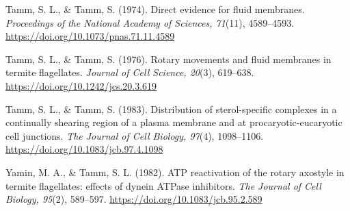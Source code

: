 \documentclass[authordate, anecdote]{jote-new-article}
\begin{document}
	



	Tamm, S. L., \& Tamm, S. (1974). Direct evidence for fluid membranes. \emph{Proceedings of} \emph{the National Academy of Sciences, 71}(11), 4589--4593. \url{https://doi.org/10.1073/pnas.71.11.4589}



	



	Tamm, S. L., \& Tamm, S. (1976). Rotary movements and fluid membranes in termite flagellates. \emph{Journal of Cell Science, 20}(3), 619--638. \url{https://doi.org/10.1242/jcs.20.3.619}



	



	Tamm, S. L., \& Tamm, S. (1983). Distribution of sterol-specific complexes in a	continually shearing region of a plasma membrane and at procaryotic-eucaryotic cell junctions. \emph{The Journal of Cell Biology, 97}(4), 1098--1106. \url{https://doi.org/10.1083/jcb.97.4.1098}



	



	Yamin, M. A., \& Tamm, S. L. (1982). ATP reactivation of the rotary axostyle in termite	flagellates: effects of dynein ATPase inhibitors. \emph{The Journal of Cell Biology, 95}(2), 589--597. \url{https://doi.org/10.1083/jcb.95.2.589}
\end{document}
